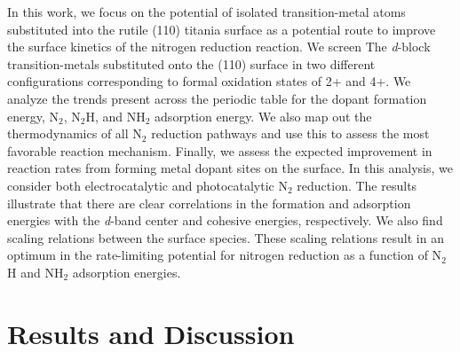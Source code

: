 In this work, we focus on the potential of isolated transition-metal atoms substituted into the rutile (110) titania surface as a potential route to improve the surface kinetics of the nitrogen reduction reaction. We screen The \textit{d}-block transition-metals substituted onto the (110) surface in two different configurations corresponding to formal oxidation states of 2+ and 4+. 
We analyze the trends present across the periodic table for the dopant formation energy, N$_2$, N$_2$H, and NH$_2$ adsorption energy. We also map out the thermodynamics of all N$_2$ reduction pathways and use this to assess the most favorable reaction mechanism. Finally, we assess the expected improvement in reaction rates from forming metal dopant sites on the surface. In this analysis, we consider both electrocatalytic and photocatalytic N$_2$ reduction. The results illustrate that there are clear correlations in the formation and adsorption energies with the \textit{d}-band center and cohesive energies, respectively. We also find scaling relations between the surface species. These scaling relations result in an optimum in the rate-limiting potential for nitrogen reduction as a function of N$_2$H and NH$_2$ adsorption energies. %

\section{Results and Discussion}

